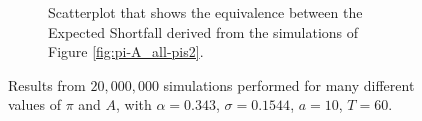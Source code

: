 \begin{figure}
\begin{subfigure}{.5\textwidth}
    \caption{Scatterplot that shows the equivalence between the Expected Shortfall derived from the simulations of Figure \ref{fig:pi-A_all-pis2}.}
    \label{fig:es-es_pi2}
\end{subfigure}
\caption{Results from $20,000,000$ simulations performed for many different values of $\pi$ and $A$, with $\alpha = 0.343$, $\sigma = 0.1544$, $a = 10$, $T = 60$.}
\label{fig:test}
\end{figure}


